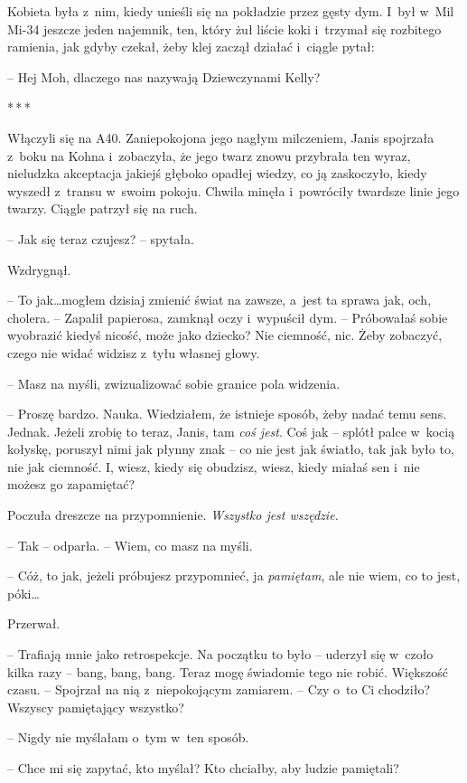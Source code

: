 \documentclass[oneside,polish,11pt,sfheadings]{mwbk}
\newcommand{\threeast}{\bigskip\par\centerline{*\,*\,*}\medskip\par}%
\begin{document}
Kobieta była z~nim, kiedy unieśli się na pokładzie przez gęsty dym. I~był w~Mil Mi-34 jeszcze jeden najemnik, ten, który żuł liście koki i~trzymał się rozbitego ramienia, jak gdyby czekał, żeby klej zaczął
działać i~ciągle pytał: 

-- Hej Moh, dlaczego nas nazywają Dziewczynami
Kelly?
  \threeast 

Włączyli się na A40. Zaniepokojona jego nagłym milczeniem, Janis
spojrzała z~boku na Kohna i~zobaczyła, że jego twarz znowu przybrała ten
wyraz, nieludzka akceptacja jakiejś głęboko opadłej wiedzy, co ją
zaskoczyło, kiedy wyszedł z~transu w~swoim pokoju. Chwila minęła i~powróciły twardsze linie jego twarzy. Ciągle patrzył się na ruch.

-- Jak się teraz czujesz? -- spytała.

Wzdrygnął. 

-- To jak\ldots mogłem dzisiaj zmienić świat na zawsze, a~jest ta
sprawa jak, och, cholera. -- Zapalił papierosa, zamknął oczy i~wypuścił
dym. -- Próbowałaś sobie wyobrazić kiedyś nicość, może jako dziecko? Nie
ciemność, nic. Żeby zobaczyć, czego nie widać widzisz z~tyłu własnej
głowy.

-- Masz na myśli, zwizualizować sobie granice pola widzenia.

-- Proszę bardzo. Nauka. Wiedziałem, że istnieje sposób, żeby nadać temu
sens. Jednak. Jeżeli zrobię to teraz, Janis, tam \emph{coś jest}. Coś
jak -- splótł palce w~kocią kołyskę, poruszył nimi jak płynny znak -- co
nie jest jak światło, tak jak było to, nie jak ciemność. I, wiesz, kiedy
się obudzisz, wiesz, kiedy miałaś sen i~nie możesz go zapamiętać?

Poczuła dreszcze na przypomnienie. \emph{Wszystko jest wszędzie.}

-- Tak -- odparła. -- Wiem, co masz na myśli.

-- Cóż, to jak, jeżeli próbujesz przypomnieć, ja \emph{pamiętam}, ale nie
wiem, co to jest, póki\ldots

Przerwał. 

-- Trafiają mnie jako retrospekcje. Na początku to było -- uderzył się w~czoło kilka razy -- bang, bang, bang. Teraz mogę świadomie
tego nie robić. Większość czasu. -- Spojrzał na nią z~niepokojącym
zamiarem. -- Czy o~to Ci chodziło? Wszyscy pamiętający wszystko?

-- Nigdy nie myślałam o~tym w~ten sposób.

-- Chce mi się zapytać, kto myślał? Kto chciałby, aby ludzie pamiętali?
\end{document}
